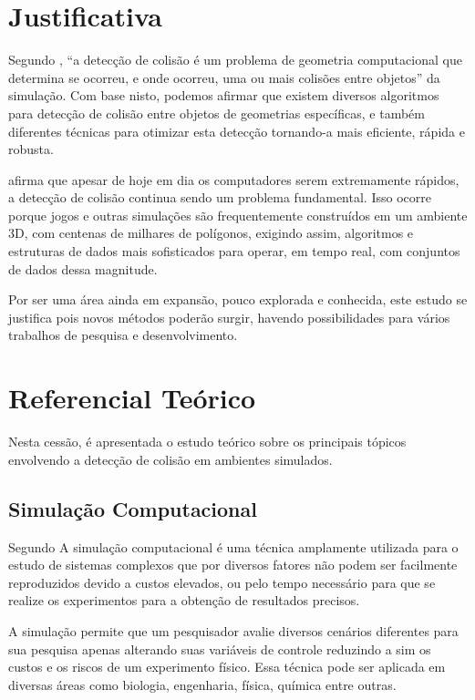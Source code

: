 \section{Justificativa}

Segundo , “a detecção de colisão é um problema de geometria computacional que determina se ocorreu, e onde ocorreu, uma ou mais colisões entre objetos” da simulação. Com base nisto, podemos afirmar que existem diversos algoritmos para detecção de colisão entre objetos de geometrias específicas, e também diferentes técnicas para otimizar esta detecção tornando-a mais eficiente, rápida e robusta.

 afirma que apesar de hoje em dia os computadores serem extremamente rápidos, a detecção de colisão continua sendo um problema fundamental. Isso ocorre porque jogos e outras simulações são frequentemente construídos em um ambiente 3D, com centenas de milhares de polígonos, exigindo assim, algoritmos e estruturas de dados mais sofisticados para operar, em tempo real, com conjuntos de dados dessa magnitude.

Por ser uma área ainda em expansão, pouco explorada e conhecida, este estudo se justifica pois novos métodos poderão surgir, havendo possibilidades para vários trabalhos de pesquisa e desenvolvimento.

\section{Referencial Teórico}

Nesta cessão, é apresentada o estudo teórico sobre os principais tópicos envolvendo a detecção de colisão em ambientes simulados.

\subsection{Simulação Computacional}

Segundo  A simulação computacional é uma técnica amplamente utilizada para o estudo de
sistemas complexos que por diversos fatores não podem ser facilmente
reproduzidos devido a custos elevados, ou pelo tempo necessário para que se
realize os experimentos para a obtenção de resultados precisos.

A simulação permite que um pesquisador avalie diversos cenários diferentes para sua
pesquisa apenas alterando suas variáveis de controle reduzindo a sim os custos
e os riscos de um experimento físico. Essa técnica pode ser aplicada em
diversas áreas como biologia, engenharia, física, química entre outras.

